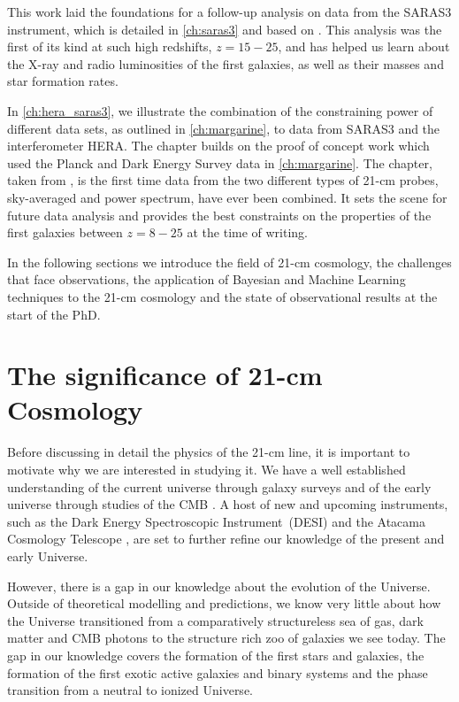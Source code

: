 This work laid the foundations for a follow-up analysis on data from the SARAS3 instrument, which is detailed in \cref{ch:saras3} and based on \cite{Bevins_saras3_2022}. This analysis was the first of its kind at such high redshifts, $z=15-25$, and has helped us learn about the X-ray and radio luminosities of the first galaxies, as well as their masses and star formation rates.

In \cref{ch:hera_saras3}, we illustrate the combination of the constraining power of different data sets, as outlined in \cref{ch:margarine}, to data from SARAS3 and the interferometer HERA. The chapter builds on the proof of concept work which used the Planck and Dark Energy Survey data in \cref{ch:margarine}. The chapter, taken from \cite{Bevins_hera_saras3_2023}, is the first time data from the two different types of 21-cm probes, sky-averaged and power spectrum, have ever been combined. It sets the scene for future data analysis and provides the best constraints on the properties of the first galaxies between $z = 8 - 25$ at the time of writing.

In the following sections we introduce the field of 21-cm cosmology, the challenges that face observations, the application of Bayesian and Machine Learning techniques to the 21-cm cosmology and the state of observational results at the start of the PhD.

\section{The significance of 21-cm Cosmology}

Before discussing in detail the physics of the 21-cm line, it is important to motivate why we are interested in studying it. We have a well established understanding of the current universe through galaxy surveys \citep[e.g.][]{Gunn2006} and of the early universe through studies of the CMB \cite{Planck2018}. A host of new and upcoming instruments, such as the Dark Energy Spectroscopic Instrument~(DESI) \cite{DESI2014} and the Atacama Cosmology Telescope \cite{ACT2007, ACT_Lensing2023}, are set to further refine our knowledge of the present and early Universe.

However, there is a gap in our knowledge about the evolution of the Universe. Outside of theoretical modelling and predictions, we know very little about how the Universe transitioned from a comparatively structureless sea of gas, dark matter and CMB photons to the structure rich zoo of galaxies we see today. The gap in our knowledge covers the formation of the first stars and galaxies, the formation of the first exotic active galaxies and binary systems and the phase transition from a neutral to ionized Universe.

